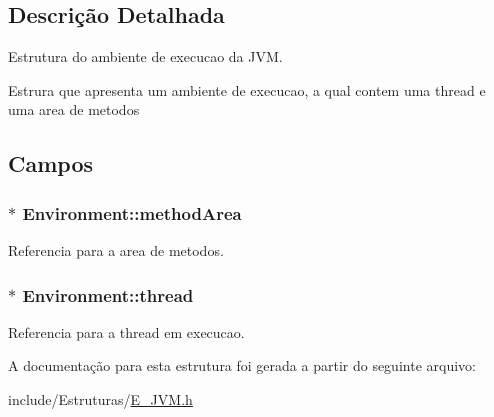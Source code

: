 \subsection{Descrição Detalhada}
Estrutura do ambiente de execucao da J\+V\+M. 

Estrura que apresenta um ambiente de execucao, a qual contem uma thread e uma area de metodos 

\subsection{Campos}
\hypertarget{struct_environment_a1c73c41c6c38e7e67ea22f6d59044852}{}
\subsubsection[{method\+Area}]{$\ast$ Environment\+::method\+Area}\label{struct_environment_a1c73c41c6c38e7e67ea22f6d59044852}


Referencia para a area de metodos. 

\hypertarget{struct_environment_a9521ae1091a45875768bdbbe0a339014}{}
\subsubsection[{thread}]{$\ast$ Environment\+::thread}\label{struct_environment_a9521ae1091a45875768bdbbe0a339014}


Referencia para a thread em execucao. 



A documentação para esta estrutura foi gerada a partir do seguinte arquivo\+:\begin{DoxyCompactItemize}
\item 
include/\+Estruturas/\hyperlink{_e___j_v_m_8h}{E\+\_\+\+J\+V\+M.\+h}\end{DoxyCompactItemize}
